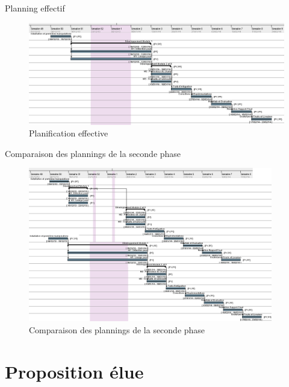 \documentclass{beamer}
\begin{document}
\begin{frame}{Planning effectif}
\begin{figure}
	\centering
		\includegraphics[width=1\textwidth]{p2_effectif}
	\caption{Planification effective}
	\label{fig:PlanningEffectif}
\end{figure}

\end{frame}
\begin{frame}{Comparaison des plannings de la seconde phase}
\begin{figure}
	\centering
		\includegraphics[width=0.95\textwidth]{p2_previ_effe}
	\caption{Comparaison des plannings de la seconde phase}
	\label{fig:PlanningEffePrevi}
\end{figure}
\end{frame}

\section{Proposition élue}
\end{document}
